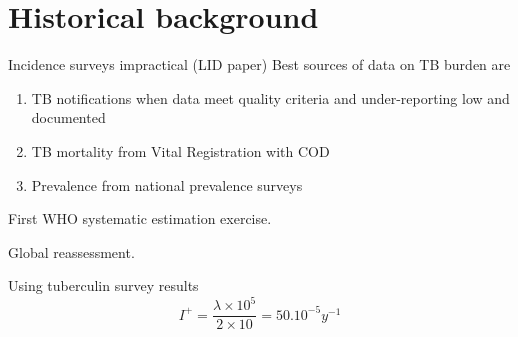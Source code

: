 \section{Historical background}

Incidence surveys impractical (LID paper)
Best sources of data on TB burden are 
\begin{enumerate}
\item TB notifications when data meet quality criteria and under-reporting low and documented
\item TB mortality from Vital Registration with COD
\item Prevalence from national prevalence surveys
\end{enumerate}

First WHO systematic estimation exercise\cite{1600578}.

Global reassessment\cite{10517722}.

Using tuberculin survey results\cite{Styblo1985}
$$I^+ = \frac{\lambda \times 10^5}{2 \times 10} = 50.10^{-5} y^{-1}$$

  
  
  
  
  
  